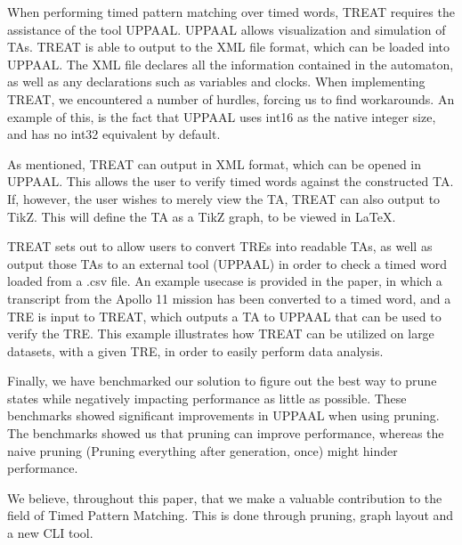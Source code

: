When performing timed pattern matching over timed words, TREAT requires the assistance of the tool UPPAAL. UPPAAL allows visualization and simulation of TAs.
TREAT is able to output to the XML file format, which can be loaded into UPPAAL. The XML file declares all the information contained in the automaton, as well as any declarations such as variables and clocks. When implementing TREAT, we encountered a number of hurdles, forcing us to find workarounds. An example of this, is the fact that UPPAAL uses int16 as the native integer size, and has no int32 equivalent by default.

As mentioned, TREAT can output in XML format, which can be opened in UPPAAL. This allows the user to verify timed words against the constructed TA. If, however, the user wishes to merely view the TA, TREAT can also output to TikZ. This will define the TA as a TikZ graph, to be viewed in LaTeX.

TREAT sets out to allow users to convert TREs into readable TAs, as well as output those TAs to an external tool (UPPAAL) in order to check a timed word loaded from a .csv file.
An example usecase is provided in the paper, in which a transcript from the Apollo 11 mission has been converted to a timed word, and a TRE is input to TREAT, which outputs a TA to UPPAAL that can be used to verify the TRE. This example illustrates how TREAT can be utilized on large datasets, with a given TRE, in order to easily perform data analysis.

Finally, we have benchmarked our solution to figure out the best way to prune states while negatively impacting performance as little as possible. These benchmarks showed significant improvements in UPPAAL when using pruning. The benchmarks showed us that pruning can improve performance, whereas the naive pruning (Pruning everything after generation, once) might hinder performance.

We believe, throughout this paper, that we make a valuable contribution to the field of Timed Pattern Matching. This is done through pruning, graph layout and a new CLI tool.